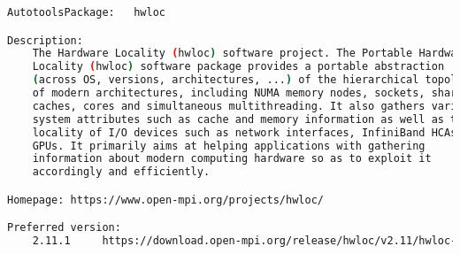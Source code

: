 % 


\small{
\begin{lstlisting}[language=bash]
AutotoolsPackage:   hwloc

Description:
    The Hardware Locality (hwloc) software project. The Portable Hardware
    Locality (hwloc) software package provides a portable abstraction
    (across OS, versions, architectures, ...) of the hierarchical topology
    of modern architectures, including NUMA memory nodes, sockets, shared
    caches, cores and simultaneous multithreading. It also gathers various
    system attributes such as cache and memory information as well as the
    locality of I/O devices such as network interfaces, InfiniBand HCAs or
    GPUs. It primarily aims at helping applications with gathering
    information about modern computing hardware so as to exploit it
    accordingly and efficiently.

Homepage: https://www.open-mpi.org/projects/hwloc/

Preferred version:  
    2.11.1     https://download.open-mpi.org/release/hwloc/v2.11/hwloc-2.11.1.tar.gz


\end{lstlisting}}

